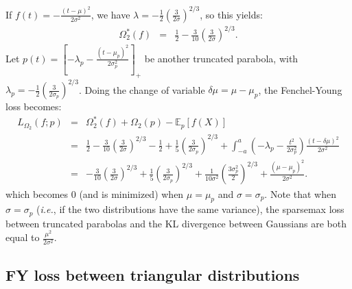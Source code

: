 \documentclass{article}
\begin{document}
{If $f(t) = -\frac{(t-\mu)^2}{2\sigma^2}$,
we have $\lambda=-\frac{1}{2}\left(\frac{3}{2\sigma} \right)^{2/3}$, so this yields:
\begin{eqnarray}
\Omega_2^*(f) &=& \frac{1}{2} -\frac{3}{10} \left(\frac{3}{2\sigma} \right)^{2/3}.
\end{eqnarray}
Let
$p(t) = [-\lambda_p - \frac{(t-\mu_p)^2}{2\sigma_p^2}]_+$ be another truncated parabola,
with $\lambda_p = -\frac{1}{2}\left( \frac{3}{2\sigma_p}\right)^{2/3}$.
Doing the change of variable $\delta \mu = \mu - \mu_p$,
the Fenchel-Young loss becomes:
\begin{eqnarray}
L_{\Omega_2}(f; p) &=&
\Omega_2^*(f) + \Omega_2(p) - \mathbb{E}_p[f(X)]\nonumber\\
&=&
\frac{1}{2} -\frac{3}{10} \left(\frac{3}{2\sigma} \right)^{2/3}
- \frac{1}{2} +\frac{1}{5} \left(\frac{3}{2\sigma_p} \right)^{2/3}
+ \int_{-a}^a \left( -\lambda_p - \frac{t^2}{2\sigma_p^2} \right) \frac{(t-\delta\mu)^2}{2\sigma^2}\nonumber\\
&=&
-\frac{3}{10} \left(\frac{3}{2\sigma} \right)^{2/3}
+\frac{1}{5} \left(\frac{3}{2\sigma_p} \right)^{2/3}
+ \frac{1}{10\sigma^2} \left(\frac{3\sigma_p^2}{2} \right)^{2/3} + \frac{(\mu-\mu_p)^2}{2\sigma^2}.
\end{eqnarray}
which becomes 0 (and is minimized) when $\mu=\mu_p$ and $\sigma=\sigma_p$.
Note that when $\sigma=\sigma_p$ (\textit{i.e.}, if the two distributions have the same variance), the sparsemax loss between truncated parabolas and the KL divergence between Gaussians are both equal to $\frac{\mu^2}{2\sigma^2}$.

\subsection{FY loss between triangular distributions}

}
\end{document}
